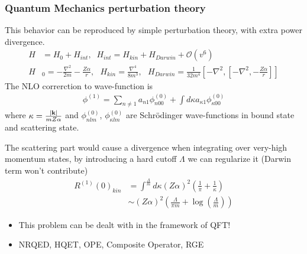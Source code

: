 \documentclass[8pt]{beamer}
\renewcommand{\a}{\alpha}
\newcommand{\ka}{\kappa}
\begin{document}
\begin{frame}
	\frametitle{Quantum Mechanics perturbation theory}
	This behavior can be reproduced by simple perturbation theory, with extra power divergence.
	\begin{align}
		H & =H_0+H_{int} ,\;\;H_{int}=H_{kin}+H_{Darwin}+\mathcal{O}(v^6)                                                                                          \nonumber \\
		H & _0=-\frac{\nabla^2}{2m}-\frac{Z\alpha}{r},\ \ \ H_{kin}=\frac{\nabla^4}{8m^3},\ \ \ H_{Darwin}=\frac{1}{32m^4}[-\nabla^2,[-\nabla^2,-\frac{Z\alpha}{r}]]
	\end{align}
	The NLO correrction to wave-function is
	\begin{align}
		\phi^{(1)}=\sum_{n\neq 1}a_{n1}\phi_{n00}^{(0)}+\int d\ka a_{\ka 1}\phi_{\ka00}^{(0)}
	\end{align}
	where $\kappa=\frac{\abs{\vb{k}}}{m Z \a}$ and $\phi_{nlm}^{(0)}$, $\phi_{\ka lm}^{(0)}$ are Schr\"odinger wave-functions in bound state and scattering state.

	The scattering part would cause a divergence when integrating over very-high momentum states, by introducing a hard cutoff $\Lambda$ we can regularize it (Darwin term won't contribute)
	\begin{align}
		R^{(1)}(0)_{kin} & =\int^\frac{\Lambda}{m}d\ka(Z\alpha)^2(\frac{1}{\pi}+\frac{1}{\ka}) \\
		                 & \sim(Z\alpha )^2(\frac{\Lambda}{\pi m}+\log(\frac{\Lambda}{m}))
	\end{align}
\end{frame}

\begin{frame}
	\begin{center}
		\LARGE
		\begin{itemize}
			\item This problem can be dealt with in the framework of QFT!
			\item NRQED, HQET, OPE, Composite Operator, RGE
		\end{itemize}

	\end{center}
\end{frame}
\end{document}

